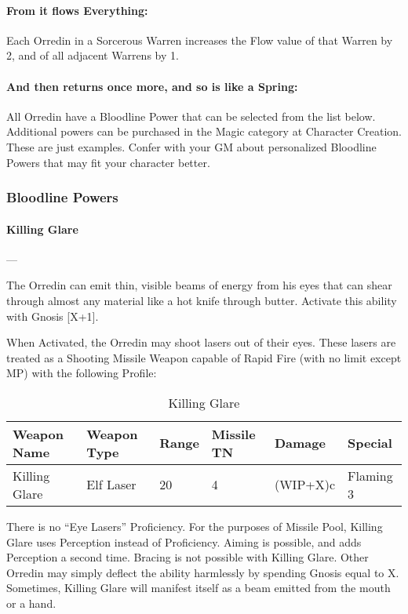 \documentclass[oneside,11pt,english]{book}
\begin{document}
\paragraph{From it flows Everything:} Each Orredin in a Sorcerous Warren increases the Flow value of that Warren by 2, and of all adjacent Warrens by 1.
\paragraph{And then returns once more, and so is like a Spring:} All Orredin have a Bloodline Power that can be selected from the list below. Additional powers can be purchased in the Magic category at Character Creation. These are just examples. Confer with your GM about personalized Bloodline Powers that may fit your character better.
\subsubsection{Bloodline Powers}
\paragraph{\large\label{man:Killing Glare}Killing Glare}---\quad{\large[X+1]}\par
The Orredin can emit thin, visible beams of energy from his eyes that can shear through almost any material like a hot knife through butter. Activate this ability with Gnosis [X+1].

When Activated, the Orredin may shoot lasers out of their eyes. These lasers are treated as a Shooting 
Missile Weapon capable of Rapid Fire (with no limit except MP) with the following Profile:

\begin{table}[!ht]
	\captionsetup{textformat=empty,labelformat=blank}
	\caption{Killing Glare}
	\label{tab:Killing Glare}
	\begin{tabu} to \textwidth {XXX[-1,c]X[c]XX}
Weapon Name&Weapon Type&Range& Missile TN&Damage&Special\\\toprule
Killing Glare&Elf Laser&20&4&(WIP+X)c&Flaming 3\\
	\end{tabu}
\end{table}

There is no “Eye Lasers” Proficiency. For the purposes of Missile Pool, Killing Glare uses Perception instead of Proficiency. Aiming is possible, and adds Perception a second time. Bracing is not possible with Killing Glare. Other Orredin may simply deflect the ability harmlessly by spending Gnosis equal to X. Sometimes, Killing Glare will manifest itself as a beam emitted from the mouth or a hand.
\end{document}
